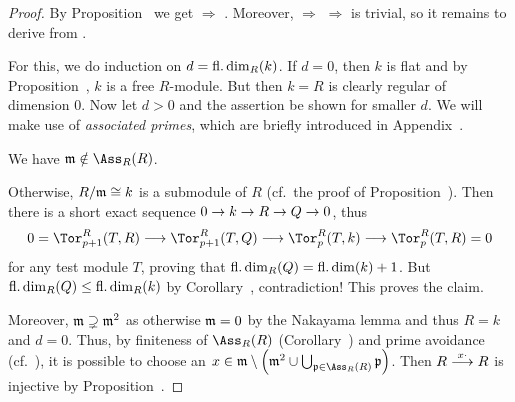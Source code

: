 \documentclass[a4paper,parskip=half,numbers=enddot, DIV=12]{scrreprt}
\begin{document}
\begin{proof}
	By Proposition~ we get  $\Rightarrow$ . Moreover,  $\Rightarrow$  $\Rightarrow$  is trivial, so it remains to derive  from .
	
	For this, we do induction on $d=\operatorname{fl.dim}_R(k)$. If $d=0$, then $k$ is flat and by Proposition~, $k$ is a free $R$-module. But then $k=R$ is clearly regular of dimension $0$. Now let $d>0$ and the assertion be shown for smaller $d$. We will make use of \emph{associated primes}, which are briefly introduced in Appendix~. 
	\begin{claim}
		We have $\mm\notin\Ass_R(R)$.
	\end{claim}
	Otherwise, $R/\mathfrak{m}\cong k$ is a submodule of $R$ (cf.\ the proof of Proposition~). Then there is a short exact sequence $0\morphism k\morphism R\morphism Q\morphism 0$, thus
	\begin{align*}
		0=\Tor_{p+1}^R(T,R)\morphism\Tor_{p+1}^R(T,Q)\morphism\Tor_p^R(T,k)\morphism\Tor_p^R(T,R)=0
	\end{align*}
	for any test module $T$, proving that $\operatorname{fl.dim}_R(Q)=\operatorname{fl.dim} (k)+1$. But $\operatorname{fl.dim}_R(Q)\leq\operatorname{fl.dim}_R(k)$ by Corollary~, contradiction! This proves the claim.
	
	Moreover, $\mathfrak{m}\supsetneq\mathfrak{m}^2$ as otherwise $\mathfrak{m}=0$ by the Nakayama lemma and thus $R=k$ and $d=0$. Thus, by finiteness of $\Ass_R(R)$ (Corollary~) and prime avoidance (cf.\ \cite[Lemma~2.5.1]{alg1}), it is possible to choose an $x\in\mm\setminus \left(\mm^2\cup\bigcup_{\pp\in\Ass_R(R)}\pp\right)$. Then $R\morphism[x\cdot]R$ is injective by Proposition~. 
	

\end{proof}
\end{document}
